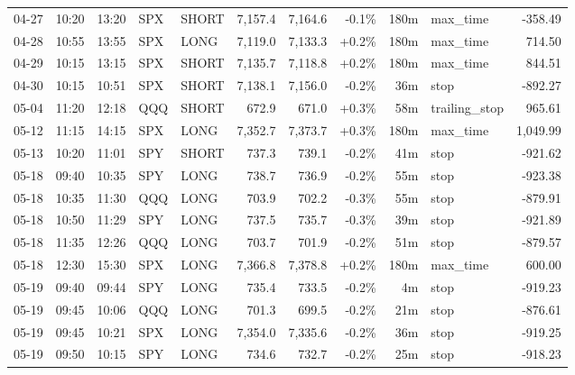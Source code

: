\documentclass[11pt,a4paper,twoside]{article}
\begin{document}
\begin{center}
\begin{longtable}{>{\color{txtmain}}l l l l l r r r r >{\color{txtmain}}l r}
04-27 & 10:20 & 13:20 & SPX & SHORT & 7,157.4 & 7,164.6 & \textcolor{lossred}{-0.1\%} & 180m & max\_time & \textcolor{lossred}{-358.49} \\
04-28 & 10:55 & 13:55 & SPX & LONG & 7,119.0 & 7,133.3 & \textcolor{wingreen}{+0.2\%} & 180m & max\_time & \textcolor{wingreen}{714.50} \\
04-29 & 10:15 & 13:15 & SPX & SHORT & 7,135.7 & 7,118.8 & \textcolor{wingreen}{+0.2\%} & 180m & max\_time & \textcolor{wingreen}{844.51} \\
04-30 & 10:15 & 10:51 & SPX & SHORT & 7,138.1 & 7,156.0 & \textcolor{lossred}{-0.2\%} & 36m & stop & \textcolor{lossred}{-892.27} \\
05-04 & 11:20 & 12:18 & QQQ & SHORT & 672.9 & 671.0 & \textcolor{wingreen}{+0.3\%} & 58m & trailing\_stop & \textcolor{wingreen}{965.61} \\
05-12 & 11:15 & 14:15 & SPX & LONG & 7,352.7 & 7,373.7 & \textcolor{wingreen}{+0.3\%} & 180m & max\_time & \textcolor{wingreen}{1,049.99} \\
05-13 & 10:20 & 11:01 & SPY & SHORT & 737.3 & 739.1 & \textcolor{lossred}{-0.2\%} & 41m & stop & \textcolor{lossred}{-921.62} \\
05-18 & 09:40 & 10:35 & SPY & LONG & 738.7 & 736.9 & \textcolor{lossred}{-0.2\%} & 55m & stop & \textcolor{lossred}{-923.38} \\
05-18 & 10:35 & 11:30 & QQQ & LONG & 703.9 & 702.2 & \textcolor{lossred}{-0.3\%} & 55m & stop & \textcolor{lossred}{-879.91} \\
05-18 & 10:50 & 11:29 & SPY & LONG & 737.5 & 735.7 & \textcolor{lossred}{-0.3\%} & 39m & stop & \textcolor{lossred}{-921.89} \\
05-18 & 11:35 & 12:26 & QQQ & LONG & 703.7 & 701.9 & \textcolor{lossred}{-0.2\%} & 51m & stop & \textcolor{lossred}{-879.57} \\
05-18 & 12:30 & 15:30 & SPX & LONG & 7,366.8 & 7,378.8 & \textcolor{wingreen}{+0.2\%} & 180m & max\_time & \textcolor{wingreen}{600.00} \\
05-19 & 09:40 & 09:44 & SPY & LONG & 735.4 & 733.5 & \textcolor{lossred}{-0.2\%} & 4m & stop & \textcolor{lossred}{-919.23} \\
05-19 & 09:45 & 10:06 & QQQ & LONG & 701.3 & 699.5 & \textcolor{lossred}{-0.2\%} & 21m & stop & \textcolor{lossred}{-876.61} \\
05-19 & 09:45 & 10:21 & SPX & LONG & 7,354.0 & 7,335.6 & \textcolor{lossred}{-0.2\%} & 36m & stop & \textcolor{lossred}{-919.25} \\
05-19 & 09:50 & 10:15 & SPY & LONG & 734.6 & 732.7 & \textcolor{lossred}{-0.2\%} & 25m & stop & \textcolor{lossred}{-918.23} \\

\end{longtable}
\end{center}
\end{document}
